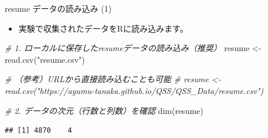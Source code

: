 \documentclass[
  ignorenonframetext,
]{beamer}
\newenvironment{Shaded}{\begin{snugshade}}{\end{snugshade}}
\newcommand{\CommentTok}[1]{\textcolor[rgb]{0.56,0.35,0.01}{\textit{#1}}}
\newcommand{\FunctionTok}[1]{\textcolor[rgb]{0.00,0.00,0.00}{#1}}
\newcommand{\NormalTok}[1]{#1}
\newcommand{\OtherTok}[1]{\textcolor[rgb]{0.56,0.35,0.01}{#1}}
\newcommand{\StringTok}[1]{\textcolor[rgb]{0.31,0.60,0.02}{#1}}
\providecommand{\tightlist}{%
  \setlength{\itemsep}{0pt}\setlength{\parskip}{0pt}}
\begin{document}
\begin{frame}[fragile]{resume データの読み込み (1)}
\protect\hypertarget{resume-ux30c7ux30fcux30bfux306eux8aadux307fux8fbcux307f-1}{}
\begin{itemize}
\tightlist
\item
  実験で収集されたデータをRに読み込みます。
\end{itemize}

\scriptsize

\begin{Shaded}
\begin{Highlighting}[]
\CommentTok{\# 1. ローカルに保存したresumeデータの読み込み（推奨）}
\NormalTok{resume }\OtherTok{\textless{}{-}} \FunctionTok{read.csv}\NormalTok{(}\StringTok{"resume.csv"}\NormalTok{)}

\CommentTok{\# （参考）URLから直接読み込むことも可能}
\CommentTok{\# resume \textless{}{-} read.csv("https://ayumu{-}tanaka.github.io/QSS/QSS\_Data/resume.csv")}

\CommentTok{\# 2. データの次元（行数と列数）を確認}
\FunctionTok{dim}\NormalTok{(resume)}
\end{Highlighting}
\end{Shaded}

\begin{verbatim}
## [1] 4870    4
\end{verbatim}

\normalsize
\end{frame}
\end{document}
